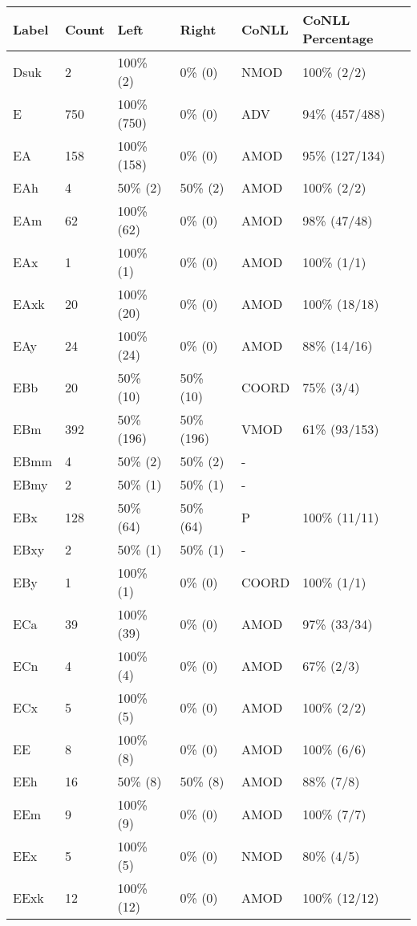 \begin{figure*}
\begin{tabular}{|l|l|l|l||l|l|}
\hline
Label & Count & Left & Right & CoNLL & CoNLL Percentage\\ 
\hline
 Dsuk & 2 & 100\% (2) & 0\% (0) & NMOD & 100\% (2/2) \\ 
\hline
 E & 750 & 100\% (750) & 0\% (0) & ADV & 94\% (457/488) \\ 
\hline
 EA & 158 & 100\% (158) & 0\% (0) & AMOD & 95\% (127/134) \\ 
\hline
 EAh & 4 & 50\% (2) & 50\% (2) & AMOD & 100\% (2/2) \\ 
\hline
 EAm & 62 & 100\% (62) & 0\% (0) & AMOD & 98\% (47/48) \\ 
\hline
 EAx & 1 & 100\% (1) & 0\% (0) & AMOD & 100\% (1/1) \\ 
\hline
 EAxk & 20 & 100\% (20) & 0\% (0) & AMOD & 100\% (18/18) \\ 
\hline
 EAy & 24 & 100\% (24) & 0\% (0) & AMOD & 88\% (14/16) \\ 
\hline
 EBb & 20 & 50\% (10) & 50\% (10) & COORD & 75\% (3/4) \\ 
\hline
 EBm & 392 & 50\% (196) & 50\% (196) & VMOD & 61\% (93/153) \\ 
\hline
 EBmm & 4 & 50\% (2) & 50\% (2) & - &  \\ 
\hline
 EBmy & 2 & 50\% (1) & 50\% (1) & - &  \\ 
\hline
 EBx & 128 & 50\% (64) & 50\% (64) & P & 100\% (11/11) \\ 
\hline
 EBxy & 2 & 50\% (1) & 50\% (1) & - &  \\ 
\hline
 EBy & 1 & 100\% (1) & 0\% (0) & COORD & 100\% (1/1) \\ 
\hline
 ECa & 39 & 100\% (39) & 0\% (0) & AMOD & 97\% (33/34) \\ 
\hline
 ECn & 4 & 100\% (4) & 0\% (0) & AMOD & 67\% (2/3) \\ 
\hline
 ECx & 5 & 100\% (5) & 0\% (0) & AMOD & 100\% (2/2) \\ 
\hline
 EE & 8 & 100\% (8) & 0\% (0) & AMOD & 100\% (6/6) \\ 
\hline
 EEh & 16 & 50\% (8) & 50\% (8) & AMOD & 88\% (7/8) \\ 
\hline
 EEm & 9 & 100\% (9) & 0\% (0) & AMOD & 100\% (7/7) \\ 
\hline
 EEx & 5 & 100\% (5) & 0\% (0) & NMOD & 80\% (4/5) \\ 
\hline
 EExk & 12 & 100\% (12) & 0\% (0) & AMOD & 100\% (12/12) \\ 

\end{tabular}
\end{figure*}
